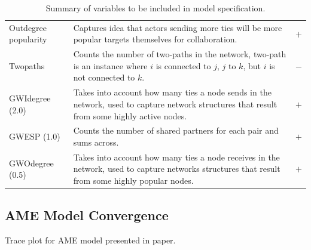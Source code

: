 \documentclass[12pt,pdflatex]{elsarticle}
\begin{document}
\begin{table}[ht]
\begin{tabular}{lLc}
	\quad Outdegree popularity & Captures idea that actors sending more ties will be more popular targets themselves for collaboration.  & $+$ \\
	\quad Twopaths & Counts the number of two-paths in the network, two-path is an instance where $i$ is connected to $j$, $j$ to $k$, but $i$ is not connected to $k$. & $-$ \\
	\quad GWIdegree (2.0) & Takes into account how many ties a node sends in the network, used to capture network structures that result from some highly active nodes.  & $+$ \\
	\quad GWESP (1.0) & Counts the number of shared partners for each pair and sums across.  & $+$ \\
	\quad GWOdegree (0.5) & Takes into account how many ties a node receives in the network, used to capture networks structures that result from some highly popular nodes.  & $+$ \\
\hline\hline
\end{tabular}
\endgroup
\caption{Summary of variables to be included in model specification.}
\label{tab:theorySpec}
\end{table}
\FloatBarrier

\clearpage
\subsection*{AME Model Convergence}
\label{sec:ameConvAppendix}

Trace plot for AME model presented in paper.
\end{document}
